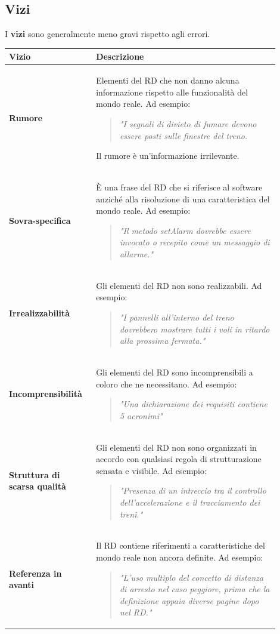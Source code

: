 \subsection{Vizi}
I \textbf{vizi} sono generalmente meno gravi rispetto agli errori.
\begin{longtable}{|m{0.27\linewidth}|m{0.63\linewidth}|}
	\hline
	\textbf{Vizio} & \textbf{Descrizione}\\
	\hline
	\textbf{Rumore} & Elementi del RD che non danno alcuna informazione rispetto alle funzionalità del mondo reale. Ad esempio:
	\begin{verse}
		\textit{"I segnali di divieto di fumare devono essere posti sulle finestre del treno.}
	\end{verse}
	Il rumore è un'informazione irrilevante.
	\\
	\hline
	\textbf{Sovra-specifica} & È una frase del RD che si riferisce al software anziché alla risoluzione di una caratteristica del mondo reale. Ad esempio:
	\begin{verse}
		\textit{"Il metodo setAlarm dovrebbe essere invocato o recepito come un messaggio di allarme."}
	\end{verse}
	\\
	\hline
	\textbf{Irrealizzabilità} & Gli elementi del RD non sono realizzabili. Ad esempio:
	\begin{verse}
		\textit{"I pannelli all'interno del treno dovrebbero mostrare tutti i voli in ritardo alla prossima fermata."}
	\end{verse}
	\\
	\hline
	\textbf{Incomprensibilità}& Gli elementi del RD sono incomprensibili a coloro che ne necessitano. Ad esempio:
	\begin{verse}
		\textit{"Una dichiarazione dei requisiti contiene 5 acronimi"}
	\end{verse}\\
	\hline
	\textbf{Struttura di scarsa qualità} & Gli elementi del RD non sono organizzati in accordo con qualsiasi regola di strutturazione sensata e visibile. Ad esempio:
	\begin{quotation}
		\textit{"Presenza di un intreccio tra il controllo dell'accelerazione e il tracciamento dei treni."}
	\end{quotation}
	\\
	\hline
	\textbf{Referenza in avanti} & Il RD contiene riferimenti a caratteristiche del mondo reale non ancora definite. Ad esempio:
	\begin{verse}
		\textit{"L'uso multiplo del concetto di distanza di arresto nel caso peggiore, prima che la definizione appaia diverse pagine dopo nel RD."}

\end{verse}
\end{longtable}

